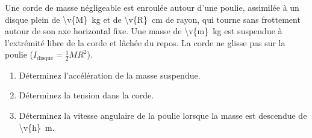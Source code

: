 Une corde de masse négligeable est enroulée autour d'une poulie, assimilée à un disque plein de \qty{\v{M}}{kg} et de \qty{\v{R}}{cm} de rayon, qui tourne sans frottement autour de son axe horizontal fixe. Une masse de \qty{\v{m}}{kg} est suspendue à l'extrémité libre de la corde et lâchée du repos. La corde ne glisse pas sur la poulie ($I_{\text{disque}} = \tfrac{1}{2}MR^2$).

\begin{center}
\end{center}

\begin{enumerate}[label=\alph*)]
    \item Déterminez l'accélération de la masse suspendue.
    \item Déterminez la tension dans la corde.
    \item Déterminez la vitesse angulaire de la poulie lorsque la masse est descendue de \qty{\v{h}}{m}.
\end{enumerate}
